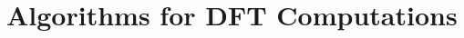 \documentclass[../course]{subfiles}
\begin{document}
\chapter{Algorithms for DFT Computations}


\end{document}
